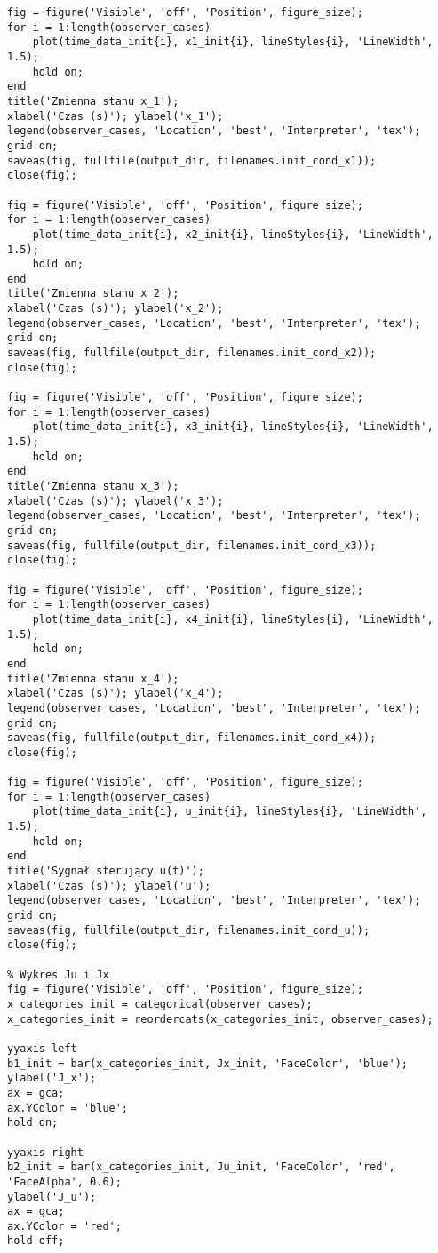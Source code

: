 \documentclass[a4paper,titlepage,11pt,floatssmall]{mwrep} %
\begin{document}
\begin{lstlisting}[style=custommatlab, caption={Pełny kod skryptu \texttt{combined\_plots.m}.}, label={lst:init_full}]
%% Zadanie 6
fig = figure('Visible', 'off', 'Position', figure_size);
for i = 1:length(observer_cases)
    plot(time_data_init{i}, x1_init{i}, lineStyles{i}, 'LineWidth', 1.5);
    hold on;
end
title('Zmienna stanu x_1');
xlabel('Czas (s)'); ylabel('x_1');
legend(observer_cases, 'Location', 'best', 'Interpreter', 'tex');
grid on;
saveas(fig, fullfile(output_dir, filenames.init_cond_x1));
close(fig);

fig = figure('Visible', 'off', 'Position', figure_size);
for i = 1:length(observer_cases)
    plot(time_data_init{i}, x2_init{i}, lineStyles{i}, 'LineWidth', 1.5);
    hold on;
end
title('Zmienna stanu x_2');
xlabel('Czas (s)'); ylabel('x_2');
legend(observer_cases, 'Location', 'best', 'Interpreter', 'tex');
grid on;
saveas(fig, fullfile(output_dir, filenames.init_cond_x2));
close(fig);

fig = figure('Visible', 'off', 'Position', figure_size);
for i = 1:length(observer_cases)
    plot(time_data_init{i}, x3_init{i}, lineStyles{i}, 'LineWidth', 1.5);
    hold on;
end
title('Zmienna stanu x_3');
xlabel('Czas (s)'); ylabel('x_3');
legend(observer_cases, 'Location', 'best', 'Interpreter', 'tex');
grid on;
saveas(fig, fullfile(output_dir, filenames.init_cond_x3));
close(fig);

fig = figure('Visible', 'off', 'Position', figure_size);
for i = 1:length(observer_cases)
    plot(time_data_init{i}, x4_init{i}, lineStyles{i}, 'LineWidth', 1.5);
    hold on;
end
title('Zmienna stanu x_4');
xlabel('Czas (s)'); ylabel('x_4');
legend(observer_cases, 'Location', 'best', 'Interpreter', 'tex');
grid on;
saveas(fig, fullfile(output_dir, filenames.init_cond_x4));
close(fig);

fig = figure('Visible', 'off', 'Position', figure_size);
for i = 1:length(observer_cases)
    plot(time_data_init{i}, u_init{i}, lineStyles{i}, 'LineWidth', 1.5);
    hold on;
end
title('Sygnał sterujący u(t)');
xlabel('Czas (s)'); ylabel('u');
legend(observer_cases, 'Location', 'best', 'Interpreter', 'tex');
grid on;
saveas(fig, fullfile(output_dir, filenames.init_cond_u));
close(fig);

% Wykres Ju i Jx
fig = figure('Visible', 'off', 'Position', figure_size);
x_categories_init = categorical(observer_cases);
x_categories_init = reordercats(x_categories_init, observer_cases);

yyaxis left
b1_init = bar(x_categories_init, Jx_init, 'FaceColor', 'blue');
ylabel('J_x');
ax = gca;
ax.YColor = 'blue';
hold on;

yyaxis right
b2_init = bar(x_categories_init, Ju_init, 'FaceColor', 'red', 'FaceAlpha', 0.6);
ylabel('J_u');
ax = gca;
ax.YColor = 'red';
hold off;


\end{lstlisting}
\end{document}
